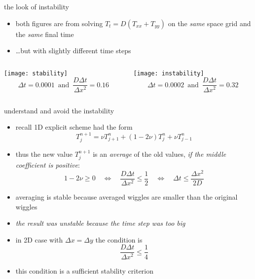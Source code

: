 \begin{frame}{the look of instability}

\begin{itemize}
\item both figures are from solving $T_t = D(T_{xx} + T_{yy})$ on the \emph{same} space grid and the \emph{same} final time
\item \dots but with slightly different time steps
\end{itemize}

\medskip
\begin{columns}
\begin{column}{0.5\textwidth}
\begin{center}
\texttt{[image: stability]}
\medskip
\small
  $$\Delta t=0.0001 \, \text{ and } \, \frac{D\Delta t}{\Delta x^2}= 0.16$$
\end{center}
\end{column}
\begin{column}{0.5\textwidth}
\begin{center}
\texttt{[image: instability]}
\small
\smallskip
  $$\Delta t=0.0002 \, \text{ and } \, \frac{D\Delta t}{\Delta x^2}= 0.32$$
\end{center}
\end{column}
\end{columns}
\end{frame}


\begin{frame}{understand and avoid the instability}

\begin{itemize}
\item recall 1D explicit scheme had the form 
	$$T_j^{n+1} = \nu T_{j+1}^n + (1 - 2 \nu) T_j^n + \nu T_{j-1}^n$$
\item thus the new value $T_j^{n+1}$ is an \emph{average} of the old values, \emph{if the middle coefficient is positive}:
	$$1 - 2 \nu \ge 0 \quad \iff \quad  \frac{D\Delta t}{\Delta x^2} \le \frac{1}{2} \quad \iff \quad \Delta t \le \frac{\Delta x^2}{2 D}$$
\item averaging is stable because averaged wiggles are smaller than the original wiggles
\item \emph{the result was unstable because the time step was too big}

\item in 2D case with $\Delta x = \Delta y$ the condition is
	$$\frac{D\Delta t}{\Delta x^2} \le \frac{1}{4}$$
\vspace{-3mm}
\item this condition is a sufficient \alert{stability criterion}
\end{itemize}
\end{frame}


